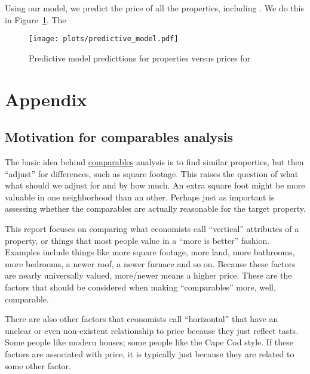 \documentclass[
12pt, %
letterpaper, %
oneside, %
headinclude,footinclude, %
BCOR5mm, %
]{scrartcl}
\begin{document}
Using our model, we predict the price of all the properties, including \PropertyName{}.
We do this in Figure~\ref{fig:predictive_model}.
The 

\begin{figure}
\centering
\caption{Predictive model predicttions for properties versus prices for \PropertyName{}} \label{fig:predictive_model}  
\texttt{[image: plots/predictive\_model.pdf]} 
\end{figure}

\renewcommand{\refname}{\spacedlowsmallcaps{References}} %


\pagebreak

\appendix

\section{Appendix} 

\subsection{Motivation for comparables analysis} \label{sec:methods}
The basic idea behind \href{https://en.wikipedia.org/wiki/Comparables}{comparables} analysis is to find similar properties, but then ``adjust'' for differences, such as square footage.
This raises the question of what what should we adjust for and by how much.
An extra square foot might be more valuable in one neighborhood than an other. 
Perhaps just as important is assessing whether the comparables are actually reasonable for the target property. 

This report focuses on comparing what economists call ``vertical'' attributes of a property, or things that most people value in a ``more is better'' fashion.
Examples include things like more square footage, more land, more bathrooms, more bedrooms, a newer roof, a newer furnace and so on.
Because these factors are nearly universally valued, more/newer means a higher price.
These are the factors that should be considered when making ``comparables'' more, well, comparable. 

There are also other factors that economists call ``horizontal'' that have an unclear or even non-existent relationship to price because they just reflect tasts.  
Some people like modern houses; some people like the Cape Cod style.
If these factors are associated with price, it is typically just because they are related to some other factor.
\end{document}
